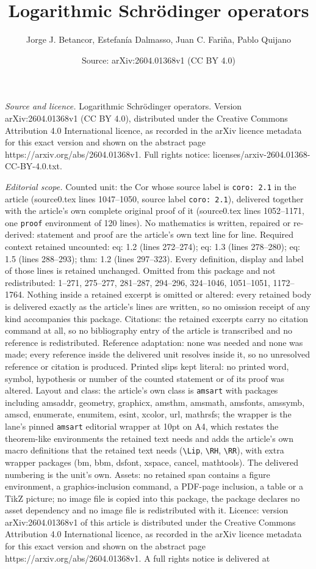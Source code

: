 \documentclass[10pt,a4paper]{amsart}
\title[Logarithmic Schr\"odinger operators]{Logarithmic Schr\"odinger operators}
\author{Jorge J. Betancor, Estefan\'ia Dalmasso, Juan C. Fari\~na, Pablo Quijano}
\date{Source: arXiv:2604.01368v1 (CC BY 4.0)}
\begin{document}
\maketitle

\noindent\emph{Source and licence.} Logarithmic Schr\"odinger operators. Version arXiv:2604.01368v1 (CC BY 4.0), distributed under the Creative Commons Attribution 4.0 International licence, as recorded in the arXiv licence metadata for this exact version and shown on the abstract page https://arxiv.org/abs/2604.01368v1. Full rights notice: licenses/arxiv-2604.01368-CC-BY-4.0.txt.\par\smallskip

\noindent\textit{Editorial scope.} Counted unit: the Cor whose source label is \texttt{coro: 2.1} in the article (source0.tex lines 1047--1050, source label \texttt{coro: 2.1}), delivered together with the article's own complete original proof of it (source0.tex lines 1052--1171, one \texttt{proof} environment of 120 lines). No mathematics is written, repaired or re-derived: statement and proof are the article's own text line for line. Required context retained uncounted: eq: 1.2 (lines 272--274); eq: 1.3 (lines 278--280); eq: 1.5 (lines 288--293); thm: 1.2 (lines 297--323). Every definition, display and label of those lines is retained unchanged. Omitted from this package and not redistributed: 1--271, 275--277, 281--287, 294--296, 324--1046, 1051--1051, 1172--1764. Nothing inside a retained excerpt is omitted or altered: every retained body is delivered exactly as the article's lines are written, so no omission receipt of any kind accompanies this package. Citations: the retained excerpts carry no citation command at all, so no bibliography entry of the article is transcribed and no reference is redistributed. Reference adaptation: none was needed and none was made; every reference inside the delivered unit resolves inside it, so no unresolved reference or citation is produced. Printed slips kept literal: no printed word, symbol, hypothesis or number of the counted statement or of its proof was altered. Layout and class: the article's own class is \texttt{amsart} with packages including amsaddr, geometry, graphicx, amsthm, amsmath, amsfonts, amssymb, amscd, enumerate, enumitem, esint, xcolor, url, mathrsfs; the wrapper is the lane's pinned \texttt{amsart} editorial wrapper at 10pt on A4, which restates the theorem-like environments the retained text needs and adds the article's own macro definitions that the retained text needs (\texttt{\textbackslash Lip}, \texttt{\textbackslash RH}, \texttt{\textbackslash RR}), with extra wrapper packages (bm, bbm, dsfont, xspace, cancel, mathtools). The delivered numbering is the unit's own. Assets: no retained span contains a figure environment, a graphics-inclusion command, a PDF-page inclusion, a table or a TikZ picture; no image file is copied into this package, the package declares no asset dependency and no image file is redistributed with it. Licence: version arXiv:2604.01368v1 of this article is distributed under the Creative Commons Attribution 4.0 International licence, as recorded in the arXiv licence metadata for this exact version and shown on the abstract page https://arxiv.org/abs/2604.01368v1. A full rights notice is delivered at 
\end{document}
